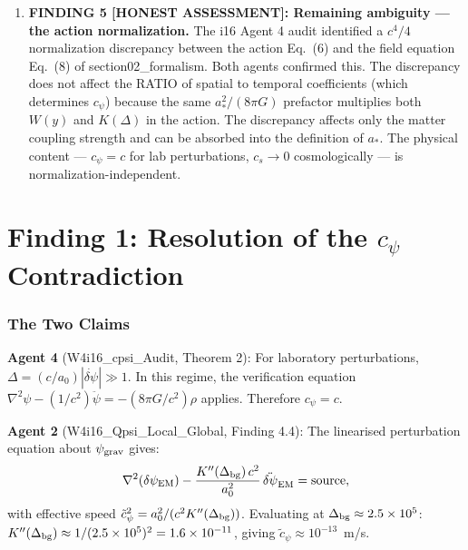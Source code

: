 \documentclass[11pt]{article}
\newcommand{\ee}[1]{\times 10^{#1}}
\newcommand{\dpsi}{\delta\psi}
\theoremstyle{definition}
\theoremstyle{remark}
\begin{document}
\begin{tcolorbox}[colback=red!5!white, colframe=red!60!black,
  title=\textbf{W4i17 P2: $c_\psi$ CONTRADICTION --- RESOLVED}]
\begin{enumerate}
\item \textbf{FINDING 5 [HONEST ASSESSMENT]: Remaining ambiguity ---
  the action normalization.} The i16 Agent 4 audit identified a
  $c^4/4$ normalization discrepancy between the action Eq.~(6) and the
  field equation Eq.~(8) of section02\_formalism. Both agents confirmed
  this. The discrepancy does not affect the RATIO of spatial to temporal
  coefficients (which determines $c_\psi$) because the same $a_*^2/(8\pi G)$
  prefactor multiplies both $W(y)$ and $K(\Delta)$ in the action. The
  discrepancy affects only the matter coupling strength and can be
  absorbed into the definition of $a_*$. The physical content ---
  $c_\psi = c$ for lab perturbations, $c_s \to 0$ cosmologically ---
  is normalization-independent.

\end{enumerate}

\end{tcolorbox}


\part{Finding 1: Resolution of the $c_\psi$ Contradiction}
\label{part:resolution}


\section{The Two Claims}

\textbf{Agent 4} (W4i16\_cpsi\_Audit, Theorem 2): For laboratory perturbations,
$\Delta = (c/a_0)|\dot{\delta\psi}| \gg 1$. In this regime, the verification
equation $\nabla^2\psi - (1/c^2)\ddot\psi = -(8\pi G/c^2)\rho$ applies.
Therefore $c_\psi = c$.

\textbf{Agent 2} (W4i16\_Qpsi\_Local\_Global, Finding 4.4): The linearised
perturbation equation about $\psi_{\rm grav}$ gives:
\begin{equation}
\nabla^2(\dpsi_{\rm EM}) - \frac{K''(\Delta_{\rm bg})\,c^2}{a_0^2}\,
\ddot{\delta\psi}_{\rm EM} = \text{source},
\end{equation}
with effective speed $\tilde{c}_\psi^2 = a_0^2/(c^2 K''(\Delta_{\rm bg}))$.
Evaluating at $\Delta_{\rm bg} \approx 2.5\ee{5}$:
$K''(\Delta_{\rm bg}) \approx 1/(2.5\ee{5})^2 = 1.6\ee{-11}$,
giving $\tilde{c}_\psi \approx 10^{-13}$~m/s.
\end{document}
